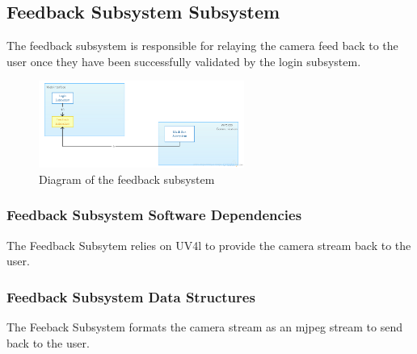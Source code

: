 \subsection{Feedback Subsystem Subsystem}
The feedback subsystem is responsible for relaying the camera feed back to the user once they have been successfully validated by the login subsystem.

\begin{figure}[h!]
	\centering
 	\includegraphics[width=0.60\textwidth]{images/ADSdiagrams/feedbacksubsystem.png}
 \caption{Diagram of the feedback subsystem}
\end{figure}

\subsubsection{Feedback Subsystem Software Dependencies}
The Feedback Subsytem relies on UV4l to provide the camera stream back to the user. 

\subsubsection{Feedback Subsystem Data Structures}
The Feeback Subsystem formats the camera stream as an mjpeg stream to send back to the user.
